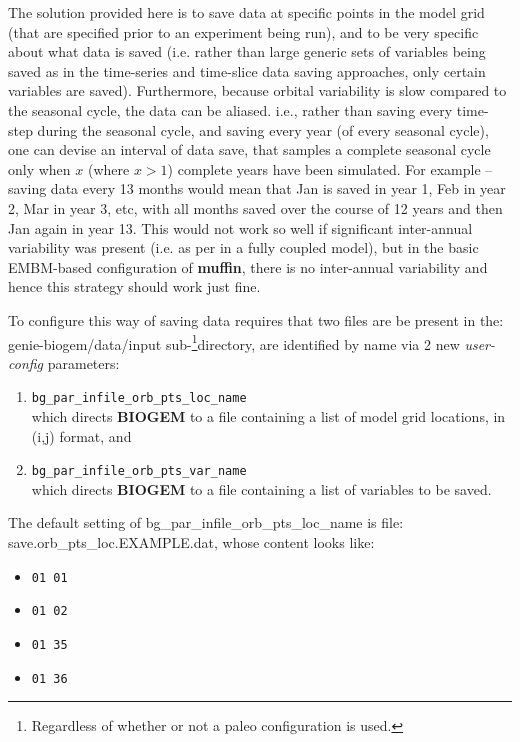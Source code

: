 \documentclass[11pt,fleqn]{book} %
\begin{document}
The solution provided here is to save data at specific points in the model grid (that are specified prior to an experiment being run), and to be very specific about what data is saved (i.e. rather than large generic sets of variables being saved as in the time-series and time-slice data saving approaches, only certain variables are saved). Furthermore, because orbital variability is slow compared to the seasonal cycle, the data can be aliased. i.e., rather than saving every time-step during the seasonal cycle, and saving every year (of every seasonal cycle), one can devise an interval of data save, that samples a complete seasonal cycle only when \(x\) (where \(x>1\)) complete years have been simulated. For example -- saving data every 13 months would mean that Jan is saved in year 1, Feb in year 2, Mar in year 3, etc, with all months saved over the course of 12 years and then Jan again in year 13. This would not work so well if significant inter-annual variability was present (i.e. as per in a fully coupled model), but in the basic EMBM-based configuration of \textbf{muffin}, there is no inter-annual variability and hence this strategy should work just fine.

\pagebreak

To configure this way of saving data requires that two files are be present in the: \\ \footnotesize\textsf{genie-biogem/data/input }\normalsize sub-\footnote{Regardless of whether or not a paleo configuration is used.}directory, are identified by name via 2 new \textit{user-config} parameters:

\vspace{2mm}
\begin{enumerate}[noitemsep]
\item \texttt{bg\_par\_infile\_orb\_pts\_loc\_name}
\\which directs \textbf{BIOGEM} to a file containing a list of model grid locations, in (i,j) format, and
\item \texttt{bg\_par\_infile\_orb\_pts\_var\_name}
\\which directs \textbf{BIOGEM} to a file containing a list of variables to be saved.
\end{enumerate}
\vspace{1mm}

The default setting of  \footnotesize\textsf{bg\_par\_infile\_orb\_pts\_loc\_name }\normalsize  is file:  \footnotesize\textsf{save.orb\_pts\_loc.EXAMPLE.dat}\normalsize, whose content looks like:
\vspace{1mm}
\begin{itemize}[noitemsep]
\item[] \texttt{01 01}
\item[] \texttt{01 02}
\item[] \texttt{01 35}
\item[] \texttt{01 36}
\end{itemize}
\vspace{1mm}
\end{document}
